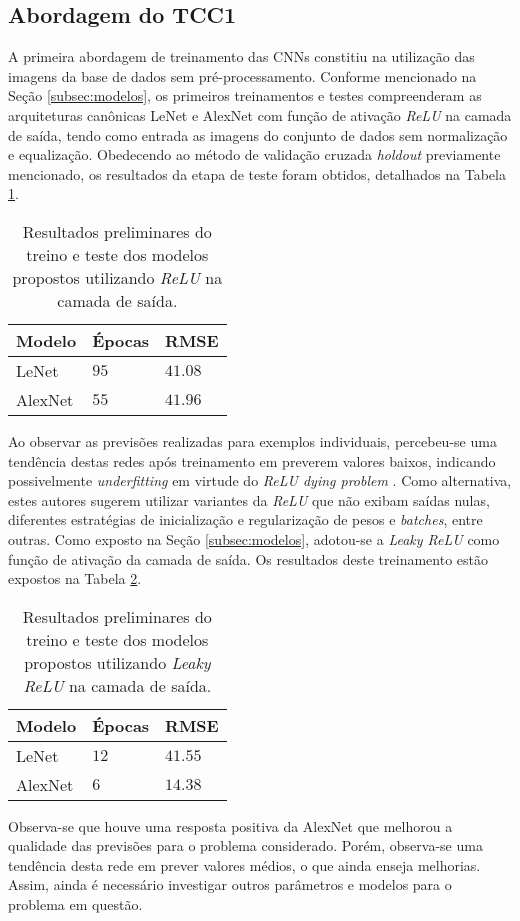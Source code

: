 
\subsection{Abordagem do TCC1}

A primeira abordagem de treinamento das CNNs constitiu na utilização das imagens da base de dados sem pré-processamento. Conforme mencionado na Seção \ref{subsec:modelos}, os primeiros treinamentos e testes compreenderam as arquiteturas canônicas LeNet e AlexNet com função de ativação \emph{ReLU} na camada de saída, tendo como entrada as imagens do conjunto de dados sem normalização e equalização. Obedecendo ao método de validação cruzada \emph{holdout} previamente mencionado, os resultados da etapa de teste foram obtidos, detalhados na Tabela \ref{tab:results_relu}.

\begin{table}[!ht]
     \caption{Resultados preliminares do treino e teste dos modelos propostos utilizando \emph{ReLU} na camada de saída.}
     \label{tab:results_relu}
     \centering
     \begin{tabular}{l l l}
          \toprule
          Modelo & Épocas &RMSE \\
          \midrule
          LeNet & $95$ & $41.08$ \\
          AlexNet & $55$ & $41.96$\\
          \bottomrule
     \end{tabular}
\end{table}

Ao observar as previsões realizadas para exemplos individuais, percebeu-se uma tendência destas redes após treinamento em preverem valores baixos, indicando possivelmente \emph{underfitting} em virtude do \emph{ReLU dying problem} \cite{djork2015elus, dabal2018elus}. Como alternativa, estes autores sugerem  utilizar variantes da \emph{ReLU} que não exibam saídas nulas, diferentes estratégias de inicialização e regularização de pesos e \emph{batches}, entre outras. Como exposto na Seção \ref{subsec:modelos}, adotou-se a \emph{Leaky ReLU} como função de ativação da camada de saída. Os resultados deste treinamento estão expostos na Tabela \ref{tab:results_leaky}.

\begin{table}[!ht]
     \caption{Resultados preliminares do treino e teste dos modelos propostos utilizando \emph{Leaky ReLU} na camada de saída.}
     \label{tab:results_leaky}
     \centering
     \begin{tabular}{l l l}
          \toprule
          Modelo & Épocas & RMSE \\
          \midrule
          LeNet & $12$ & $41.55$ \\
          AlexNet & $6$ & $14.38$\\
          \bottomrule
     \end{tabular}
\end{table}

Observa-se que houve uma resposta positiva da AlexNet que melhorou a qualidade das previsões para o problema considerado. Porém, observa-se uma tendência desta rede em prever valores médios, o que ainda enseja melhorias. Assim, ainda é necessário investigar outros parâmetros e modelos para o problema em questão.
